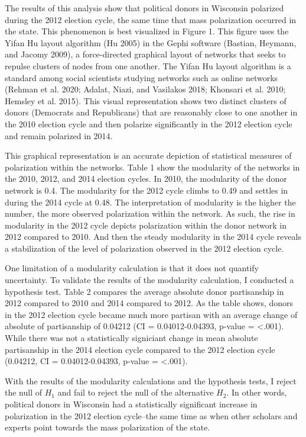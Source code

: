 \documentclass[12pt,]{article}
\begin{document}
The results of this analysis show that political donors in Wisconsin
polarized during the 2012 election cycle, the same time that mass
polarization occurred in the state. This phenomenon is best visualized
in Figure 1. This figure uses the Yifan Hu layout algorithm (Hu 2005) in
the Gephi software (Bastian, Heymann, and Jacomy 2009), a force-directed
graphical layout of networks that seeks to repulse clusters of nodes
from one another. The Yifan Hu layout algorithm is a standard among
social scientists studying networks such as online networks (Rehman et
al. 2020; Adalat, Niazi, and Vasilakos 2018; Khonsari et al. 2010;
Hemsley et al. 2015). This visual representation shows two distinct
clusters of donors (Democrats and Republicans) that are reasonably close
to one another in the 2010 election cycle and then polarize
significantly in the 2012 election cycle and remain polarized in 2014.

This graphical representation is an accurate depiction of statistical
measures of polarization within the networks. Table 1 show the
modularity of the networks in the 2010, 2012, and 2014 election cycles.
In 2010, the modularity of the donor network is 0.4. The modularity for
the 2012 cycle climbs to 0.49 and settles in during the 2014 cycle at
0.48. The interpretation of modularity is the higher the number, the
more observed polarization within the network. As such, the rise in
modularity in the 2012 cycle depicts polarization within the donor
network in 2012 compared to 2010. And then the steady modularity in the
2014 cycle reveals a stabilization of the level of polarization observed
in the 2012 election cycle.

One limitation of a modularity calculation is that it does not quantify
uncertainty. To validate the results of the modularity calculation, I
conducted a hypothesis test. Table 2 compares the average absolute donor
partisanship in 2012 compared to 2010 and 2014 compared to 2012. As the
table shows, donors in the 2012 election cycle became much more partisan
with an average change of absolute of partisanship of 0.04212 (CI =
0.04012-0.04393, p-value = \textless.001). While there was not a
statistically signiciant change in mean absolute partisanship in the
2014 election cycle compared to the 2012 election cycle (0.04212, CI =
0.04012-0.04393, p-value = \textless.001).

With the results of the modularity calculations and the hypothesis
tests, I reject the null of \(H_{1}\) and fail to reject the null of the
alternative \(H_{2}\). In other words, political donors in Wisconsin had
a statistically significant increase in polarization in the 2012
election cycle--the same time as when other scholars and experts point
towards the mass polarization of the state.
\end{document}
